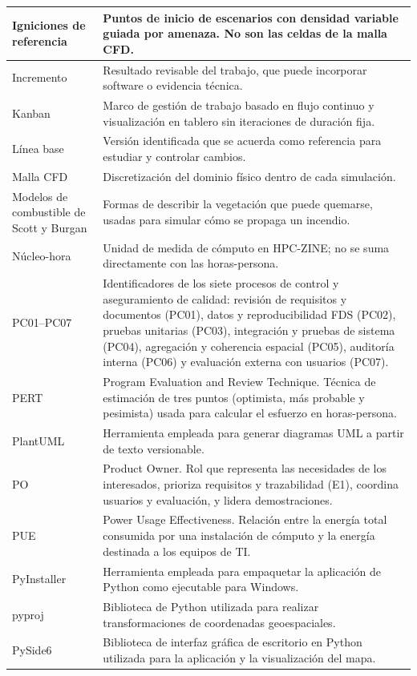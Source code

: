 \begin{longtable}{|p{0.29\dimexpr\linewidth-23pt\relax}|p{0.71\dimexpr\linewidth-23pt\relax}|}
Igniciones de referencia & Puntos de inicio de escenarios con densidad variable guiada por amenaza. No son las celdas de la malla CFD.\\\hline
Incremento & Resultado revisable del trabajo, que puede incorporar software o evidencia técnica.\\\hline
Kanban & Marco de gestión de trabajo basado en flujo continuo y visualización en tablero sin iteraciones de duración fija.\\\hline
Línea base & Versión identificada que se acuerda como referencia para estudiar y controlar cambios.\\\hline
Malla CFD & Discretización del dominio físico dentro de cada simulación.\\\hline
Modelos de combustible de Scott y Burgan & Formas de describir la vegetación que puede quemarse, usadas para simular cómo se propaga un incendio.\\\hline
Núcleo-hora & Unidad de medida de cómputo en HPC-ZINE; no se suma directamente con las horas-persona.\\\hline
PC01--PC07 & Identificadores de los siete procesos de control y aseguramiento de calidad: revisión de requisitos y documentos (PC01), datos y reproducibilidad FDS (PC02), pruebas unitarias (PC03), integración y pruebas de sistema (PC04), agregación y coherencia espacial (PC05), auditoría interna (PC06) y evaluación externa con usuarios (PC07).\\\hline
PERT & Program Evaluation and Review Technique. Técnica de estimación de tres puntos (optimista, más probable y pesimista) usada para calcular el esfuerzo en horas-persona.\\\hline
PlantUML & Herramienta empleada para generar diagramas UML a partir de texto versionable.\\\hline
PO & Product Owner. Rol que representa las necesidades de los interesados, prioriza requisitos y trazabilidad (E1), coordina usuarios y evaluación, y lidera demostraciones.\\\hline
PUE & Power Usage Effectiveness. Relación entre la energía total consumida por una instalación de cómputo y la energía destinada a los equipos de TI.\\\hline
PyInstaller & Herramienta empleada para empaquetar la aplicación de Python como ejecutable para Windows.\\\hline
pyproj & Biblioteca de Python utilizada para realizar transformaciones de coordenadas geoespaciales.\\\hline
PySide6 & Biblioteca de interfaz gráfica de escritorio en Python utilizada para la aplicación y la visualización del mapa.\\\hline

\end{longtable}
